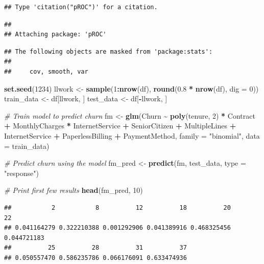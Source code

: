 \documentclass[
]{article}
\newenvironment{Shaded}{\begin{snugshade}}{\end{snugshade}}
\newcommand{\AttributeTok}[1]{\textcolor[rgb]{0.13,0.29,0.53}{#1}}
\newcommand{\CommentTok}[1]{\textcolor[rgb]{0.56,0.35,0.01}{\textit{#1}}}
\newcommand{\DecValTok}[1]{\textcolor[rgb]{0.00,0.00,0.81}{#1}}
\newcommand{\FloatTok}[1]{\textcolor[rgb]{0.00,0.00,0.81}{#1}}
\newcommand{\FunctionTok}[1]{\textcolor[rgb]{0.13,0.29,0.53}{\textbf{#1}}}
\newcommand{\NormalTok}[1]{#1}
\newcommand{\OtherTok}[1]{\textcolor[rgb]{0.56,0.35,0.01}{#1}}
\newcommand{\SpecialCharTok}[1]{\textcolor[rgb]{0.81,0.36,0.00}{\textbf{#1}}}
\newcommand{\StringTok}[1]{\textcolor[rgb]{0.31,0.60,0.02}{#1}}
\begin{document}
\begin{verbatim}
## Type 'citation("pROC")' for a citation.
\end{verbatim}

\begin{verbatim}
## 
## Attaching package: 'pROC'
\end{verbatim}

\begin{verbatim}
## The following objects are masked from 'package:stats':
## 
##     cov, smooth, var
\end{verbatim}

\begin{Shaded}
\begin{Highlighting}[]
\FunctionTok{set.seed}\NormalTok{(}\DecValTok{1234}\NormalTok{)}
\NormalTok{llwork }\OtherTok{\textless{}{-}} \FunctionTok{sample}\NormalTok{(}\DecValTok{1}\SpecialCharTok{:}\FunctionTok{nrow}\NormalTok{(df), }\FunctionTok{round}\NormalTok{(}\FloatTok{0.8} \SpecialCharTok{*} \FunctionTok{nrow}\NormalTok{(df), }\AttributeTok{dig =} \DecValTok{0}\NormalTok{))}
\NormalTok{train\_data }\OtherTok{\textless{}{-}}\NormalTok{ df[llwork, ]}
\NormalTok{test\_data }\OtherTok{\textless{}{-}}\NormalTok{ df[}\SpecialCharTok{{-}}\NormalTok{llwork, ]}

\CommentTok{\# Train model to predict churn}
\NormalTok{fm }\OtherTok{\textless{}{-}} \FunctionTok{glm}\NormalTok{(Churn }\SpecialCharTok{\textasciitilde{}} \FunctionTok{poly}\NormalTok{(tenure, }\DecValTok{2}\NormalTok{) }\SpecialCharTok{*}\NormalTok{ Contract }\SpecialCharTok{+}\NormalTok{ MonthlyCharges }\SpecialCharTok{*}\NormalTok{ InternetService }\SpecialCharTok{+}\NormalTok{ SeniorCitizen }\SpecialCharTok{+}\NormalTok{ MultipleLines }\SpecialCharTok{+}\NormalTok{ InternetService }\SpecialCharTok{+}\NormalTok{ PaperlessBilling }\SpecialCharTok{+}\NormalTok{ PaymentMethod, }\AttributeTok{family =} \StringTok{"binomial"}\NormalTok{, }\AttributeTok{data =}\NormalTok{ train\_data)}

\CommentTok{\# Predict churn using the model}
\NormalTok{fm\_pred }\OtherTok{\textless{}{-}} \FunctionTok{predict}\NormalTok{(fm, test\_data, }\AttributeTok{type =} \StringTok{"response"}\NormalTok{)}

\CommentTok{\# Print first few results}
\FunctionTok{head}\NormalTok{(fm\_pred, }\DecValTok{10}\NormalTok{)}
\end{Highlighting}
\end{Shaded}

\begin{verbatim}
##           2           8          12          18          20          22 
## 0.041164279 0.322210388 0.001292906 0.041389916 0.468325456 0.044721183 
##          25          28          31          37 
## 0.050557470 0.586235786 0.066176091 0.633474936
\end{verbatim}
\end{document}
